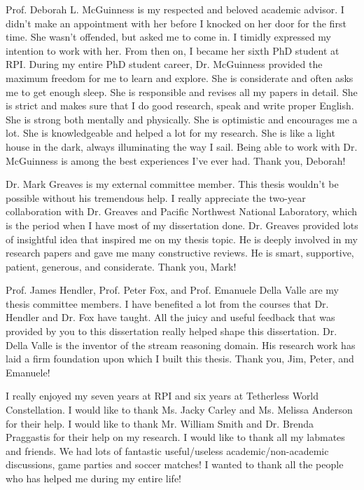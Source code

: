Prof. Deborah L. McGuinness is my respected and beloved academic advisor. 
I didn't make an appointment with her before I knocked on her door for the first time. 
She wasn't offended, but asked me to come in. 
I timidly expressed my intention to work with her. 
From then on, I became her sixth PhD student at RPI.
During my entire PhD student career, Dr. McGuinness provided the maximum freedom for me to learn and explore.
She is considerate and often asks me to get enough sleep.
She is responsible and revises all my papers in detail.
She is strict and makes sure that I do good research, speak and write proper English.
She is strong both mentally and physically. 
She is optimistic and encourages me a lot. 
She is knowledgeable and helped a lot for my research. 
She is like a light house in the dark, always illuminating the way I sail.
Being able to work with Dr. McGuinness is among the best experiences I've ever had.
Thank you, Deborah!

Dr. Mark Greaves is my external committee member. 
This thesis wouldn't be possible without his tremendous help. 
I really appreciate the two-year collaboration with Dr. Greaves and Pacific Northwest National Laboratory, which is the period when I have most of my dissertation done.
Dr. Greaves provided lots of insightful idea that inspired me on my thesis topic. 
He is deeply involved in my research papers and gave me many constructive reviews.
He is smart, supportive, patient, generous, and considerate.
Thank you, Mark!

Prof. James Hendler, Prof. Peter Fox, and Prof. Emanuele Della Valle are my thesis committee members. 
I have benefited a lot from the courses that Dr. Hendler and Dr. Fox have taught.
All the juicy and useful feedback that was provided by you to this dissertation really helped shape this dissertation.
Dr. Della Valle is the inventor of the stream reasoning domain.
His research work has laid a firm foundation upon which I built this thesis.
Thank you, Jim, Peter, and Emanuele!

I really enjoyed my seven years at RPI and six years at Tetherless World Constellation. 
I would like to thank Ms. Jacky Carley and Ms. Melissa Anderson for their help.
I would like to thank Mr. William Smith and Dr. Brenda Praggastis for their help on my research.
I would like to thank all my labmates and friends. 
We had lots of fantastic useful/useless academic/non-academic discussions, game parties and soccer matches!
I wanted to thank all the people who has helped me during my entire life!


